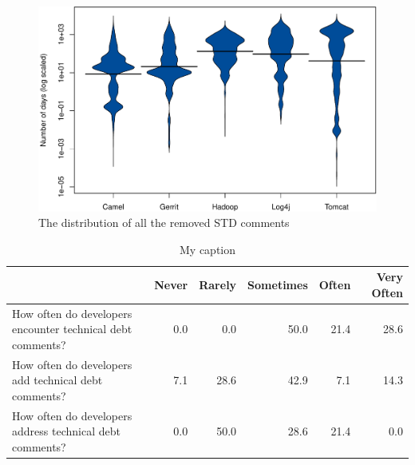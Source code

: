 












\begin{figure}[thb!]
	\centering
	\includegraphics[width=\columnwidth]{figures/test/removed_all_STD_comments.pdf}
	\caption{The distribution of all the removed STD comments}
	\label{fig:removed_all_std_comments}
\end{figure}







\begin{table}[]
	\centering
	\caption{My caption}
	\label{my-label}
	\begin{tabular}{@{}lrrrrr@{}}
		\toprule
		\textbf{} & \textbf{Never} & \textbf{Rarely} & \textbf{Sometimes} & \textbf{Often} & \textbf{Very Often} \\ \midrule
		How often do developers encounter technical debt comments? & 0.0 & 0.0 & 50.0 & 21.4 & 28.6 \\
		How often do developers add technical debt comments? & 7.1 & 28.6 & 42.9 & 7.1 & 14.3 \\
		How often do developers address technical debt comments? & 0.0 & 50.0 & 28.6 & 21.4 & 0.0 \\ \bottomrule
	\end{tabular}
\end{table}





